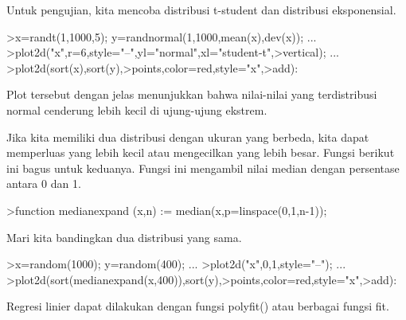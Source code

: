 \documentclass[a4paper,10pt]{article}
\begin{document}
\begin{eulernotebook}
\begin{eulercomment}
Untuk pengujian, kita mencoba distribusi t-student dan distribusi
eksponensial.
\end{eulercomment}
\begin{eulerprompt}
>x=randt(1,1000,5); y=randnormal(1,1000,mean(x),dev(x)); ...
>plot2d("x",r=6,style="--",yl="normal",xl="student-t",>vertical); ...
>plot2d(sort(x),sort(y),>points,color=red,style="x",>add):
\end{eulerprompt}
\begin{eulercomment}
Plot tersebut dengan jelas menunjukkan bahwa nilai-nilai yang
terdistribusi normal cenderung lebih kecil di ujung-ujung ekstrem.

Jika kita memiliki dua distribusi dengan ukuran yang berbeda, kita
dapat memperluas yang lebih kecil atau mengecilkan yang lebih besar.
Fungsi berikut ini bagus untuk keduanya. Fungsi ini mengambil nilai
median dengan persentase antara 0 dan 1.
\end{eulercomment}
\begin{eulerprompt}
>function medianexpand (x,n) := median(x,p=linspace(0,1,n-1));
\end{eulerprompt}
\begin{eulercomment}
Mari kita bandingkan dua distribusi yang sama.
\end{eulercomment}
\begin{eulerprompt}
>x=random(1000); y=random(400); ...
>plot2d("x",0,1,style="--"); ...
>plot2d(sort(medianexpand(x,400)),sort(y),>points,color=red,style="x",>add):
\end{eulerprompt}
\begin{eulercomment}
Regresi linier dapat dilakukan dengan fungsi polyfit() atau berbagai
fungsi fit.


\end{eulercomment}
\end{eulernotebook}
\end{document}
